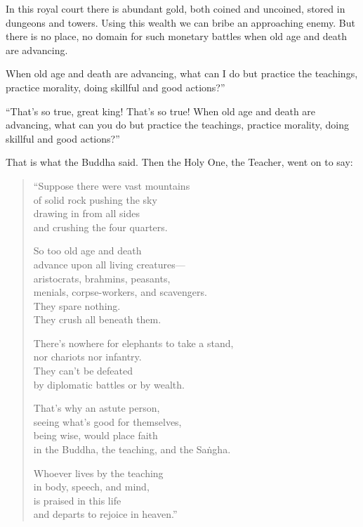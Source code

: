 \documentclass[12pt,openany]{book}%
\begin{document}
In this royal court there is abundant gold, both coined and uncoined, stored in dungeons and towers. Using this wealth we can bribe an approaching enemy. But there is no place, no domain for such monetary battles when old age and death are advancing. 

When old age and death are advancing, what can I do but practice the teachings, practice morality, doing skillful and good actions?” 

“That’s so true, great king! That’s so true! When old age and death are advancing, what can you do but practice the teachings, practice morality, doing skillful and good actions?” 

That is what the Buddha said. Then the Holy One, the Teacher, went on to say: 

\begin{verse}%
“Suppose there were vast mountains \\
of solid rock pushing the sky \\
drawing in from all sides \\
and crushing the four quarters. 

So too old age and death \\
advance upon all living creatures—\\
aristocrats, brahmins, peasants, \\
menials, corpse-workers, and scavengers. \\
They spare nothing. \\
They crush all beneath them. 

There’s nowhere for elephants to take a stand, \\
nor chariots nor infantry. \\
They can’t be defeated \\
by diplomatic battles or by wealth. 

That’s why an astute person, \\
seeing what’s good for themselves, \\
being wise, would place faith \\
in the Buddha, the teaching, and the \textsanskrit{Saṅgha}. 

Whoever lives by the teaching \\
in body, speech, and mind, \\
is praised in this life \\
and departs to rejoice in heaven.” 

%
\end{verse}
\end{document}
